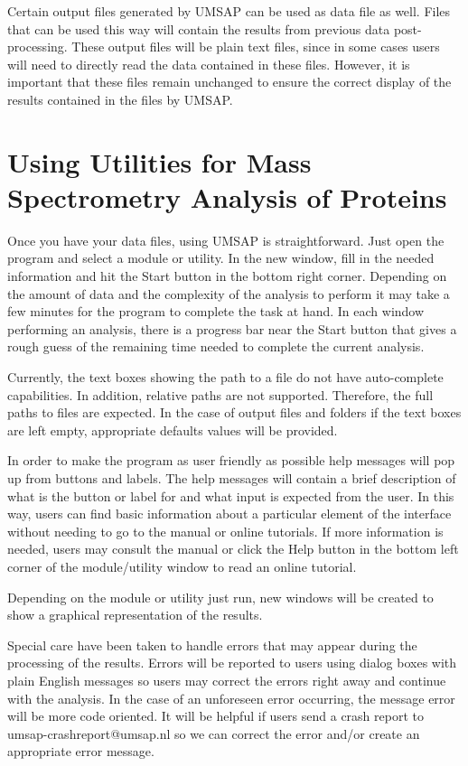 Certain output files generated by UMSAP can be used as data file as well. Files that can be used this way will contain the results from previous data post-processing. These output files will be plain text files, since in some cases users will need to directly read the data contained in these files. However, it is important that these files remain unchanged to ensure the correct display of the results contained in the files by UMSAP.

\section{Using Utilities for Mass Spectrometry Analysis of Proteins}

Once you have your data files, using UMSAP is straightforward. Just open the program and select a module or utility. In the new window, fill in the needed information and hit the Start button in the bottom right corner. Depending on the amount of data and the complexity of the analysis to perform it may take a few minutes for the program to complete the task at hand. In each window performing an analysis, there is a progress bar near the Start button that gives a rough guess of the remaining time needed to complete the current analysis.

Currently, the text boxes showing the path to a file  do not have auto-complete capabilities. In addition, relative paths are not supported. Therefore, the full paths to files are expected. In the case of output files and folders if the text boxes are left empty, appropriate defaults values will be provided.  

In order to make the program as user friendly as possible help messages will pop up from buttons and labels. The help messages will contain a brief description of what is the button or label for and what input is expected from the user. In this way, users can find basic information about a particular element of the interface without needing to go to the manual or online tutorials. If more information is needed, users may consult the manual or click the Help button in the bottom left corner of the module/utility window to read an online tutorial. 

Depending on the module or utility just run, new windows will be created to show a graphical representation of the results.

Special care have been taken to handle errors that may appear during the processing of the results. Errors will be reported to users using dialog boxes with plain English messages so users may correct the errors right away and continue with the analysis. In the case of an unforeseen error occurring, the message error will be more code oriented. It will be helpful if users send a crash report to umsap-crashreport@umsap.nl so we can correct the error and/or create an appropriate error message. 

